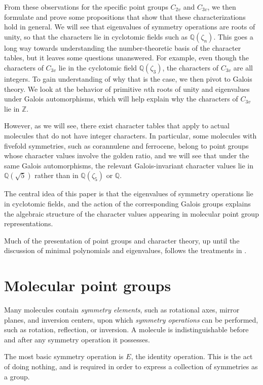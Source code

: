 \documentclass{article}
\begin{document}
    From these observations for the specific point groups $C_{2v}$ and $C_{3v}$, we then formulate and prove some propositions that show that these characterizations hold in general. We will see that eigenvalues of symmetry operations are roots of unity, so that the characters lie in cyclotomic fields such as $\mathbb{Q}(\zeta_n)$. This goes a long way towards understanding the number-theoretic basis of the character tables, but it leaves some questions unanswered. For example, even though the characters of $C_{3v}$ lie in the cyclotomic field $\mathbb{Q}(\zeta_3)$, the characters of $C_{3v}$ are all integers. To gain understanding of why that is the case, we then pivot to Galois theory. We look at the behavior of primitive $n$th roots of unity and eigenvalues under Galois automorphisms, which will help explain why the characters of $C_{3v}$ lie in $\mathbb{Z}$.

    However, as we will see, there exist character tables that apply to actual molecules that do not have integer characters. In particular, some molecules with fivefold symmetries, such as corannulene and ferrocene, belong to point groups whose character values involve the golden ratio, and we will see that under the same Galois automorphisms, the relevant Galois-invariant character values lie in $\mathbb{Q}(\sqrt{5})$ rather than in $\mathbb{Q}(\zeta_5)$ or $\mathbb{Q}$.

    The central idea of this paper is that the eigenvalues of symmetry operations lie in cyclotomic fields, and the action of the corresponding Galois groups explains the algebraic structure of the character values appearing in molecular point group representations.
    
    Much of the presentation of point groups and character theory, up until the discussion of minimal polynomials and eigenvalues, follows the treatments in \cite{miessler2014,mcgrady2024,vallance,young}.
    
    \section{Molecular point groups}

    Many molecules contain \emph{symmetry elements}, such as rotational axes, mirror planes, and inversion centers, upon which \emph{symmetry operations} can be performed, such as rotation, reflection, or inversion. A molecule is indistinguishable before and after any symmetry operation it possesses.

    The most basic symmetry operation is $E$, the identity operation. This is the act of doing nothing, and is required in order to express a collection of symmetries as a group.
\end{document}
